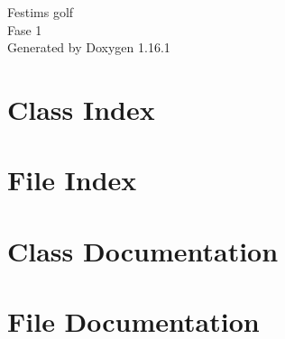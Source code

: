 \documentclass[twoside]{book}
\newcommand{\+}{\discretionary{\mbox{\scriptsize$\hookleftarrow$}}{}{}}
\newcommand{\clearemptydoublepage}{%
    \newpage{\pagestyle{empty}\cleardoublepage}%
  }
\begin{document}
  \raggedbottom
    \hypersetup{pageanchor=false,
                bookmarksnumbered=true,
                pdfencoding=unicode
               }
  \begin{titlepage}
  \vspace*{7cm}
  \begin{center}%
  {\Large Festim\textquotesingle{}s golf}\\
  [1ex]\large Fase 1 \\
  \vspace*{1cm}
  {\large Generated by Doxygen 1.16.1}\\
  \end{center}
  \end{titlepage}
  \clearemptydoublepage
  \tableofcontents
  \clearemptydoublepage
  \hypersetup{pageanchor=true}

\chapter{Class Index}

\chapter{File Index}

\chapter{Class Documentation}





\chapter{File Documentation}




























  \backmatter
  \newpage
  \clearemptydoublepage
  \printindex
\end{document}
